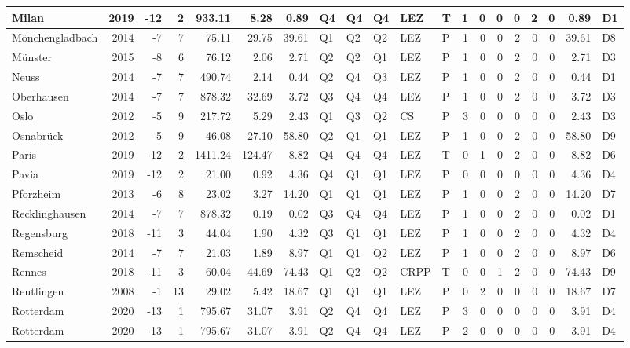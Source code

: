\begin{tabular}{l|r|r|r|r|r|r|l|l|l|l|l|r|r|r|r|r|r|r|l}
\hline
Milan & 2019 & -12 & 2 & 933.11 & 8.28 & 0.89 & Q4 & Q4 & Q4 & LEZ & T & 1 & 0 & 0 & 0 & 2 & 0 & 0.89 & D1\\
\hline
Mönchengladbach & 2014 & -7 & 7 & 75.11 & 29.75 & 39.61 & Q1 & Q2 & Q2 & LEZ & P & 1 & 0 & 0 & 2 & 0 & 0 & 39.61 & D8\\
\hline
Münster & 2015 & -8 & 6 & 76.12 & 2.06 & 2.71 & Q2 & Q2 & Q1 & LEZ & P & 1 & 0 & 0 & 2 & 0 & 0 & 2.71 & D3\\
\hline
Neuss & 2014 & -7 & 7 & 490.74 & 2.14 & 0.44 & Q2 & Q4 & Q3 & LEZ & P & 1 & 0 & 0 & 2 & 0 & 0 & 0.44 & D1\\
\hline
Oberhausen & 2014 & -7 & 7 & 878.32 & 32.69 & 3.72 & Q3 & Q4 & Q4 & LEZ & P & 1 & 0 & 0 & 2 & 0 & 0 & 3.72 & D3\\
\hline
Oslo & 2012 & -5 & 9 & 217.72 & 5.29 & 2.43 & Q1 & Q3 & Q2 & CS & P & 3 & 0 & 0 & 0 & 0 & 0 & 2.43 & D3\\
\hline
Osnabrück & 2012 & -5 & 9 & 46.08 & 27.10 & 58.80 & Q2 & Q1 & Q1 & LEZ & P & 1 & 0 & 0 & 2 & 0 & 0 & 58.80 & D9\\
\hline
Paris & 2019 & -12 & 2 & 1411.24 & 124.47 & 8.82 & Q4 & Q4 & Q4 & LEZ & T & 0 & 1 & 0 & 2 & 0 & 0 & 8.82 & D6\\
\hline
Pavia & 2019 & -12 & 2 & 21.00 & 0.92 & 4.36 & Q4 & Q1 & Q1 & LEZ & P & 0 & 0 & 0 & 0 & 0 & 0 & 4.36 & D4\\
\hline
Pforzheim & 2013 & -6 & 8 & 23.02 & 3.27 & 14.20 & Q1 & Q1 & Q1 & LEZ & P & 1 & 0 & 0 & 2 & 0 & 0 & 14.20 & D7\\
\hline
Recklinghausen & 2014 & -7 & 7 & 878.32 & 0.19 & 0.02 & Q3 & Q4 & Q4 & LEZ & P & 1 & 0 & 0 & 2 & 0 & 0 & 0.02 & D1\\
\hline
Regensburg & 2018 & -11 & 3 & 44.04 & 1.90 & 4.32 & Q3 & Q1 & Q1 & LEZ & P & 1 & 0 & 0 & 2 & 0 & 0 & 4.32 & D4\\
\hline
Remscheid & 2014 & -7 & 7 & 21.03 & 1.89 & 8.97 & Q1 & Q1 & Q2 & LEZ & P & 1 & 0 & 0 & 2 & 0 & 0 & 8.97 & D6\\
\hline
Rennes & 2018 & -11 & 3 & 60.04 & 44.69 & 74.43 & Q1 & Q2 & Q2 & CRPP & T & 0 & 0 & 1 & 2 & 0 & 0 & 74.43 & D9\\
\hline
Reutlingen & 2008 & -1 & 13 & 29.02 & 5.42 & 18.67 & Q1 & Q1 & Q1 & LEZ & P & 0 & 2 & 0 & 0 & 0 & 0 & 18.67 & D7\\
\hline
Rotterdam & 2020 & -13 & 1 & 795.67 & 31.07 & 3.91 & Q2 & Q4 & Q4 & LEZ & P & 3 & 0 & 0 & 0 & 0 & 0 & 3.91 & D4\\
\hline
Rotterdam & 2020 & -13 & 1 & 795.67 & 31.07 & 3.91 & Q2 & Q4 & Q4 & LEZ & P & 2 & 0 & 0 & 0 & 0 & 0 & 3.91 & D4\\

\end{tabular}

